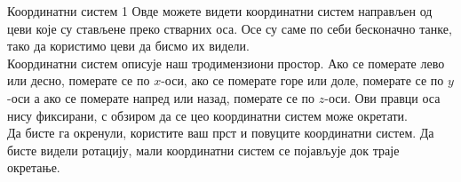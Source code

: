 \begin{surferPage}{Координатни систем 1}
Овде можете видети координатни систем направљен од цеви које су стављене преко стварних оса. Осе су саме по себи бесконачно танке, тако да користимо цеви да бисмо их видели.\\
Координатни систем описује наш тродимензиони простор. Ако се померате лево или десно, померате се по $x$-оси, ако се померате горе или доле, померате се по $y$-оси а ако се померате напред или назад, померате се по $z$-оси. Ови правци оса нису фиксирани, с обзиром да се цео координатни систем може окретати.\\
\vspace{0.3cm}
Да бисте га окренули, користите ваш прст и повуците координатни систем. Да бисте видели ротацију, мали координатни систем се појављује док траје окретање.
\end{surferPage}
